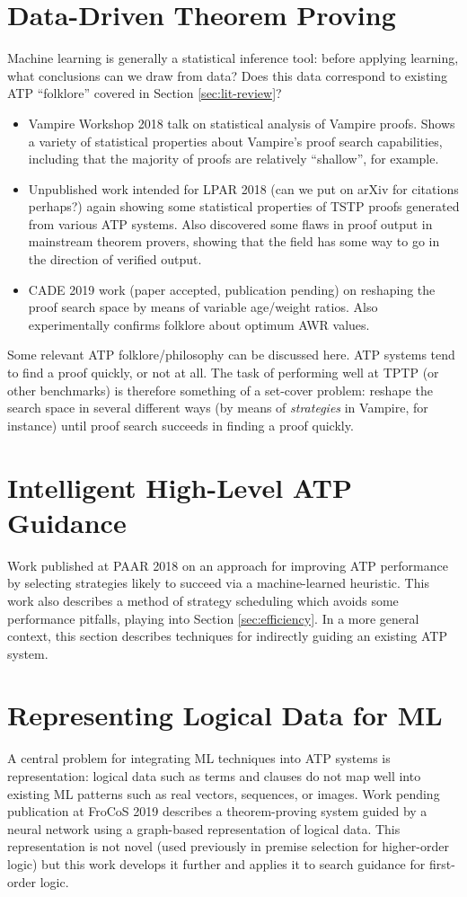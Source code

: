 \documentclass[a4paper]{article}
\begin{document}
\section{Data-Driven Theorem Proving}
\label{sec:data}
Machine learning is generally a statistical inference tool: before applying learning, what conclusions can we draw from data?
Does this data correspond to existing ATP ``folklore'' covered in Section \ref{sec:lit-review}?
\begin{itemize}
	\item Vampire Workshop 2018 talk on statistical analysis of Vampire proofs. Shows a variety of statistical properties about Vampire's proof search capabilities, including that the majority of proofs are relatively ``shallow'', for example.
	\item Unpublished work intended for LPAR 2018 (can we put on arXiv for citations perhaps?) again showing some statistical properties of TSTP proofs generated from various ATP systems. Also discovered some flaws in proof output in mainstream theorem provers, showing that the field has some way to go in the direction of verified output.
	\item CADE 2019 work (paper accepted, publication pending) on reshaping the proof search space by means of variable age/weight ratios. Also experimentally confirms folklore about optimum AWR values.
\end{itemize}
Some relevant ATP folklore/philosophy can be discussed here.
ATP systems tend to find a proof quickly, or not at all.
The task of performing well at TPTP (or other benchmarks) is therefore something of a set-cover problem: reshape the search space in several different ways (by means of \emph{strategies} in Vampire, for instance) until proof search succeeds in finding a proof quickly.

\section{Intelligent High-Level ATP Guidance}
Work published at PAAR 2018 on an approach for improving ATP performance by selecting strategies likely to succeed via a machine-learned heuristic.
This work also describes a method of strategy scheduling which avoids some performance pitfalls, playing into Section \ref{sec:efficiency}.
In a more general context, this section describes techniques for indirectly guiding an existing ATP system.

\section{Representing Logical Data for ML}
\label{sec:representation}
A central problem for integrating ML techniques into ATP systems is representation: logical data such as terms and clauses do not map well into existing ML patterns such as real vectors, sequences, or images.
Work pending publication at FroCoS 2019 describes a theorem-proving system guided by a neural network using a graph-based representation of logical data.
This representation is not novel (used previously in premise selection for higher-order logic) but this work develops it further and applies it to search guidance for first-order logic.
\end{document}
